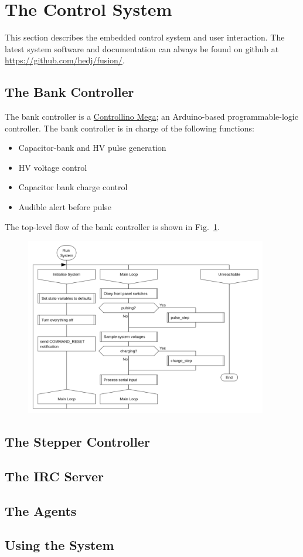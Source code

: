 
\section{The Control System}

This section describes the embedded control system and user interaction.
The latest system software and documentation can always be found on github at \url{https://github.com/hedj/fusion/}.

\subsection{The Bank Controller}

The bank controller is a \href{http://controllino.biz/product/controllino-mega/}{Controllino Mega}; an
Arduino-based programmable-logic controller. The bank controller is in charge of the following functions:
\begin{itemize}
  \item{Capacitor-bank and HV pulse generation}
  \item{HV voltage control}
  \item{Capacitor bank charge control}
  \item{Audible alert before pulse}
\end{itemize}

The top-level flow of the bank controller is shown in Fig.~\ref{fig:toplevelbank}.

\begin{figure}
  \includegraphics[width=400px]{top-level-flowchart.png}
\caption{\label{fig:toplevelbank}}
\end{figure}



\subsection{The Stepper Controller}
\subsection{The IRC Server}
\subsection{The Agents}
\subsection{Using the System}
